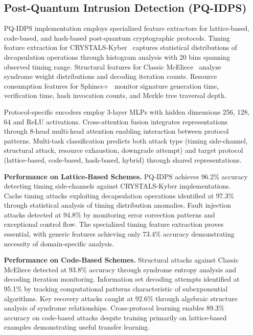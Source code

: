 \subsection{Post-Quantum Intrusion Detection (PQ-IDPS)}

PQ-IDPS implementation employs specialized feature extractors for lattice-based, code-based, and hash-based post-quantum cryptographic protocols. Timing feature extraction for CRYSTALS-Kyber~\cite{avanzi2019crystals} captures statistical distributions of decapsulation operations through histogram analysis with 20 bins spanning observed timing range. Structural features for Classic McEliece~\cite{bernstein2017classic} analyze syndrome weight distributions and decoding iteration counts. Resource consumption features for Sphincs+~\cite{bernstein2019sphincs} monitor signature generation time, verification time, hash invocation counts, and Merkle tree traversal depth.

Protocol-specific encoders employ 3-layer MLPs with hidden dimensions 256, 128, 64 and ReLU activations. Cross-attention fusion integrates representations through 8-head multi-head attention enabling interaction between protocol patterns. Multi-task classification predicts both attack type (timing side-channel, structural attack, resource exhaustion, downgrade attempt) and target protocol (lattice-based, code-based, hash-based, hybrid) through shared representations.

\textbf{Performance on Lattice-Based Schemes.} PQ-IDPS achieves 96.2\% accuracy detecting timing side-channels against CRYSTALS-Kyber implementations. Cache timing attacks exploiting decapsulation operations identified at 97.3\% through statistical analysis of timing distribution anomalies. Fault injection attacks detected at 94.8\% by monitoring error correction patterns and exceptional control flow. The specialized timing feature extraction proves essential, with generic features achieving only 73.4\% accuracy demonstrating necessity of domain-specific analysis.

\textbf{Performance on Code-Based Schemes.} Structural attacks against Classic McEliece detected at 93.8\% accuracy through syndrome entropy analysis and decoding iteration monitoring. Information set decoding attempts identified at 95.1\% by tracking computational patterns characteristic of subexponential algorithms. Key recovery attacks caught at 92.6\% through algebraic structure analysis of syndrome relationships. Cross-protocol learning enables 89.3\% accuracy on code-based attacks despite training primarily on lattice-based examples demonstrating useful transfer learning.

